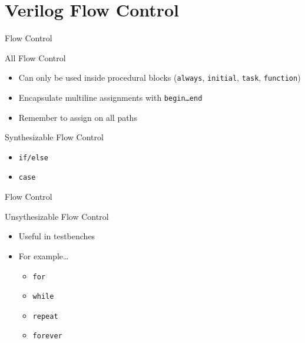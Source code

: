 \documentclass[table,dvipsnames,colorlinks=true]{beamer}
\begin{document}
\section{Verilog Flow Control}
\begin{frame}{Flow Control}
    \begin{block}{All Flow Control}
        \begin{itemize}
            \item Can only be used inside procedural blocks
                (\texttt{always}, \texttt{initial}, \texttt{task}, 
                \texttt{function})
            \item Encapsulate multiline assignments with \texttt{begin{\dots}end}
            \item Remember to assign on all paths
        \end{itemize}
    \end{block}
    \begin{block}{Synthesizable Flow Control}
        \begin{itemize}
            \item \texttt{if/else} 
            \item \texttt{case} 
        \end{itemize}
    \end{block}
\end{frame}

\begin{frame}{Flow Control}
    \begin{block}{Unsythesizable Flow Control}
        \begin{itemize}
            \item Useful in testbenches
            \item For example\dots
            \begin{itemize}
                \item \texttt{for}
                \item \texttt{while}
                \item \texttt{repeat}
                \item \texttt{forever}
            \end{itemize}
    \end{itemize}
    \end{block}
\end{frame}
\end{document}
